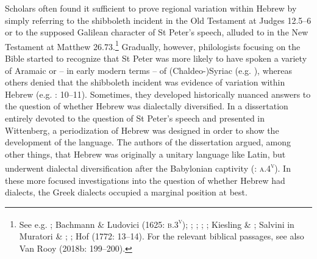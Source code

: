 \documentclass[output=paper]{langsci/langscibook}
\begin{document}
Scholars often found it sufficient to prove regional variation within Hebrew by simply referring to the shibboleth incident in the Old Testament at Judges 12.5–6 or to the supposed Galilean character of St Peter’s speech, alluded to in the New Testament at Matthew 26.73.\footnote{See e.g. \citet[6]{Bovelles1533}; Bachmann \& Ludovici (1625: \textsc{b.3}\textsc{\textsuperscript{v}}); \citet[102]{Weemes1632}; \citet[2]{Wyss1650}; \citet[18]{Walton1657}; \citet[180]{Webb1669}; Kiesling \& \citet[6]{Bause1712}; Salvini in Muratori \& \citet[103]{Salvini1724}; \citet[30]{Hauptmann1751}; Hof (1772: 13–14). For the relevant biblical passages, see also Van Rooy (2018b: 199–200).} Gradually, however, philologists focusing on the Bible started to recognize that St Peter was more likely to have spoken a variety of Aramaic or – in early modern terms – of (Chaldeo-)Syriac (e.g. \citealt{PfeifferMartini1663}), whereas others denied that the shibboleth incident was evidence of variation within Hebrew (e.g. \citealt{Mayer1629}: 10–11). Sometimes, they developed historically nuanced answers to the question of whether Hebrew was dialectally diversified. In a dissertation entirely devoted to the question of St Peter’s speech and presented in Wittenberg, a periodization of Hebrew was designed in order to show the development of the language. The authors of the dissertation argued, among other things, that Hebrew was originally a unitary language like Latin, but underwent dialectal diversification after the Babylonian captivity (\citealt{PfeifferMartini1663}: \textsc{a.4}\textsc{\textsuperscript{v}}). In these more focused investigations into the question of whether Hebrew had dialects, the Greek dialects occupied a marginal position at best.
\end{document}
